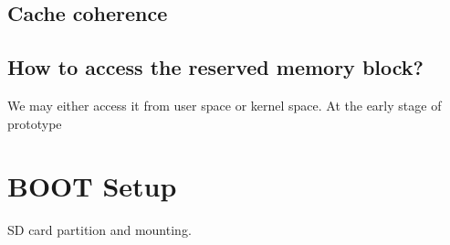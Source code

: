 \documentclass[12pt]{article} %
\begin{document}
\subsection{Cache coherence}

\subsection{How to access the reserved memory block?}
We may either access it from user space or kernel space. At the early stage of prototype

\section{BOOT Setup}
SD card partition and mounting. \cite{rootfs-mount}



\end{document}
